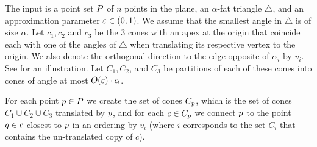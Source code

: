 \documentclass[12pt]{article}%
\begin{document}
The input is a point set $P$ of $n$ points in the plane, an
$\alpha$-fat triangle $\triangle$, and an approximation parameter
$\varepsilon \in (0,1)$. We assume that the smallest angle in $\triangle$ is
of size $\alpha$. Let $c_1,c_2$ and $c_3$ be the 3 cones with an apex
at the origin that coincide each with one of the angles of $\triangle$
when translating its respective vertex to the origin. We also denote
the orthogonal direction to the edge opposite of $\alpha_i$ by
$v_i$. See  for an illustration. Let $C_1,C_2$, and
$C_3$ be partitions of each of these cones into cones of angle at most
$O(\varepsilon)\cdot \alpha$.

For each point $p\in P$ we create the set of cones $C_p$, which
is the set of cones $C_1\cup C_2\cup C_3$ translated by $p$, and for
each $c\in C_p$ we connect $p$ to the point $q\in c$ closest to
$p$ in an ordering by $v_i$ (where $i$ corresponds to the set $C_i$
that contains the un-translated copy of $c$).
  
%
%
\end{document}
